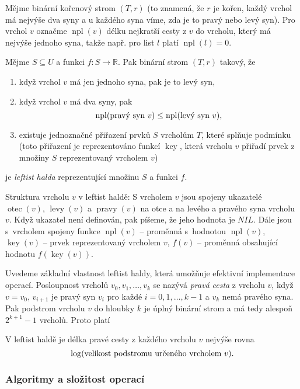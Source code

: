 \documentclass[a4paper,12pt]{article}
\DeclareMathOperator*{\otec}{otec}
\DeclareMathOperator*{\levy}{levy}
\DeclareMathOperator*{\pravy}{pravy}
\DeclareMathOperator*{\key}{key}
\DeclareMathOperator*{\npl}{npl}
\begin{document}
Mějme binární kořenový strom $(T,r)$ (to znamená, že $
r$ je kořen, 
každý vrchol má nejvýše dva syny a u každého syna 
víme, zda je to pravý nebo levý syn). Pro vrchol $v$ 
označme $\npl(v)$ délku nejkratší cesty z $v$ do vrcholu, který má 
nejvýše jednoho syna, takže např. pro list $l$ platí $\npl
(l)=0$. 

Mějme $S\subseteq U$ a funkci $f:S\to\mathbb R$. Pak binární strom 
$(T,r)$ takový, že
\begin{enumerate}
\item
když vrchol $v$ má jen jednoho syna, pak je to levý syn,
\item
když vrchol $v$ má dva syny, pak 
$$\npl(\text{\rm pravý syn }v)\le\npl(\text{\rm levý syn }v),$$
\item
existuje jednoznačné přiřazení prvků $S$  
vrcholům $T$, které splňuje podmínku  
(toto přiřazení 
je reprezentováno funkcí $\key$, která vrcholu $v$ přiřadí prvek 
z množi\-ny $S$ reprezentovaný vrcholem $v$)
\end{enumerate}
je \emph{leftist} \emph{halda} 
reprezentující množinu $S$ a funkci $f$. 

Struktura vrcholu $v$ v leftist haldě:\newline 
S vrcholem $v$ jsou 
spojeny ukazatelé $\otec(v)$, $\levy(v)$ a $\pravy(v)$ na otce a 
na levého a pravého syna vrcholu $v$.  
Když ukazatel není definován, pak píšeme, že jeho hodnota je 
$NIL$.  Dále jsou s~vrcholem spojeny funkce\newline 
$\npl(v)$ -- proměnná s~hodnotou $\npl(v)$,\newline 
$\key(v)$ -- prvek reprezentovaný vrcholem $v$,\newline 
$f(v)$ -- proměnná obsahující hodnotu $f(\key(v))$.

Uvedeme základní vlastnost leftist haldy, která 
umožňuje efektivní implementace operací. 
Posloupnost vrcholů $v_0,v_1,\dots,v_k$ se nazývá 
\emph{pravá} \emph{cesta} z vrcholu $v$, když $v=v_0$, $v_{i
+1}$ 
je pravý syn $v_i$ pro každé $i=0,1,\dots,k-1$ a $v_k$ nemá 
pravého syna. Pak podstrom vrcholu $v$ do hloubky $k$ je 
úplný binární strom a má tedy  
alespoň $2^{k+1}-1$ vrcholů. Proto platí 

\begin{tvrzeni}V leftist haldě je 
délka pravé cesty z každého vrcholu $v$ nejvýše rovna 
$$\log(\text{\rm velikost podstromu určeného vrcholem }v).$$
\end{tvrzeni}

\subsubsection{Algoritmy a složitost operací}
\end{document}

